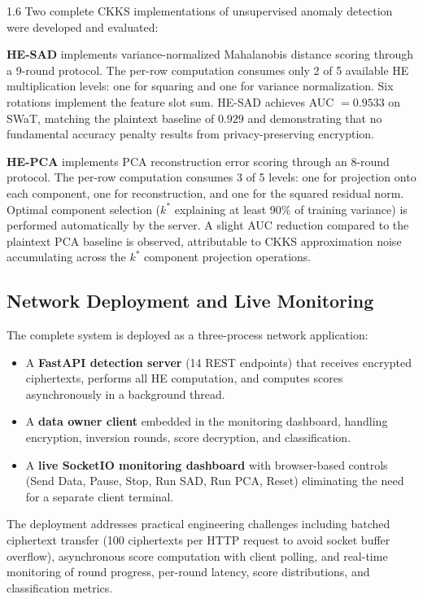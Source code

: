 \begin{spacing}{1.6}
Two complete CKKS implementations of unsupervised anomaly detection were
developed and evaluated:

\textbf{HE-SAD} implements variance-normalized Mahalanobis distance scoring
through a 9-round protocol. The per-row computation consumes only 2 of 5
available HE multiplication levels: one for squaring and one for variance
normalization. Six rotations implement the feature slot sum. HE-SAD achieves
AUC $= 0.9533$ on SWaT, matching the plaintext baseline of $0.929$ and
demonstrating that no fundamental accuracy penalty results from privacy-preserving
encryption.

\textbf{HE-PCA} implements PCA reconstruction error scoring through an 8-round
protocol. The per-row computation consumes 3 of 5 levels: one for projection
onto each component, one for reconstruction, and one for the squared residual
norm. Optimal component selection ($k^*$ explaining at least 90\% of training
variance) is performed automatically by the server. A slight AUC reduction
compared to the plaintext PCA baseline is observed, attributable to CKKS
approximation noise accumulating across the $k^*$ component projection
operations.

\subsection{Network Deployment and Live Monitoring}

The complete system is deployed as a three-process network application:

\begin{itemize}
  \item A \textbf{FastAPI detection server} (14 REST endpoints) that receives
  encrypted ciphertexts, performs all HE computation, and computes scores
  asynchronously in a background thread.
  \item A \textbf{data owner client} embedded in the monitoring dashboard,
  handling encryption, inversion rounds, score decryption, and classification.
  \item A \textbf{live SocketIO monitoring dashboard} with browser-based
  controls (Send Data, Pause, Stop, Run SAD, Run PCA, Reset) eliminating the
  need for a separate client terminal.
\end{itemize}

The deployment addresses practical engineering challenges including batched
ciphertext transfer (100 ciphertexts per HTTP request to avoid socket buffer
overflow), asynchronous score computation with client polling, and real-time
monitoring of round progress, per-round latency, score distributions, and
classification metrics.


\end{spacing}
